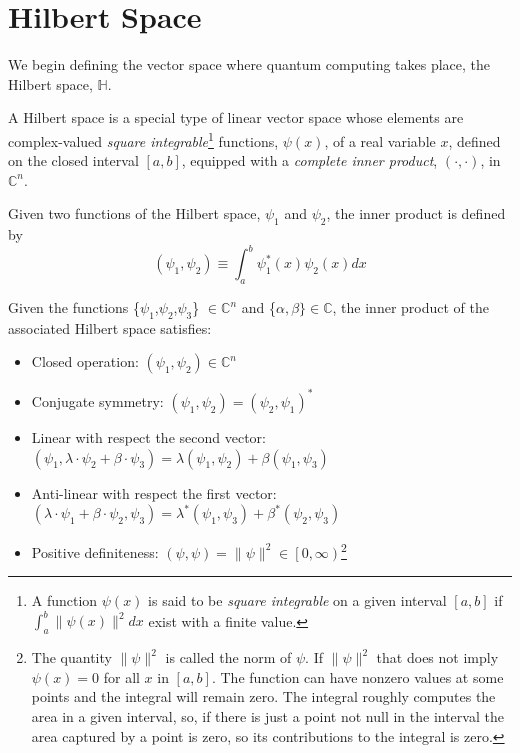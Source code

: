 \section{Hilbert Space}
We begin defining the vector space where quantum computing takes place, the Hilbert space, $\mathbb{H}$.
\begin{definition}
A Hilbert space is a special type of linear vector space whose elements are complex-valued \textit{square integrable}\footnote{A function $\psi(x)$ is said to be \textit{square integrable} on a given interval $\left[a, b\right]$ if $\int_{a}^{b}\|\psi(x)\|^{2}dx$ exist with a finite value.} functions, $\psi(x)$, of a real variable $x$, defined on the closed interval $\left[a, b\right]$, equipped with a \textit{complete inner product}, $(\cdot,\cdot)$, in $\mathbb{C}^{n}$.
\end{definition}
\begin{definition}
Given two functions of the Hilbert space, $\psi_{1}$ and $\psi_{2}$, the inner product is defined by
\begin{equation}
    \left(\psi_{1}, \psi_{2}\right) \equiv \int^{b}_{a} \psi_{1}^{*}(x)\psi_{2}(x)dx
\end{equation}
\end{definition}
\begin{corollary}
Given the functions \{$\psi_{1}$,$\psi_{2}$,$\psi_{3}$\} $\in \mathbb{C}^{n}$ and \{$\alpha, \beta\} \in \mathbb{C}$, the inner product of the associated Hilbert space satisfies:
\begin{itemize}
    \item Closed operation: $(\psi_{1},\psi_{2})\in \mathbb{C}^{n}$
    \item Conjugate symmetry: $(\psi_{1},\psi_{2}) = (\psi_{2},\psi_{1})^{*}$
    \item Linear with respect the second vector: $(\psi_{1},\lambda \cdot \psi_{2} + \beta\cdot\psi_{3}) = \lambda(\psi_{1},\psi_{2}) + \beta(\psi_{1},\psi_{3})$
    \item Anti-linear with respect the first vector: $(\lambda \cdot \psi_{1} + \beta \cdot \psi_{2}, \psi_{3}) = \lambda^{*}(\psi_{1},\psi_{3}) + \beta^{*} (\psi_{2},\psi_{3})$
    \item Positive definiteness: $(\psi, \psi) = \lVert \psi \rVert^{2} \in \left[0,\infty\right)$\footnote{The quantity $\lVert \psi \rVert^{2}$ is called the norm of $\psi$. If $\lVert \psi \rVert^{2}$ that does not imply $\psi(x) = 0$ for all $x$ in $\left[a,b\right]$. The function can have nonzero values at some points and the integral will remain zero. The integral roughly computes the area in a given interval, so, if there is just a point not null in the interval the area captured by a point is zero, so its contributions to the integral is zero.} 
\end{itemize}    
\end{corollary}
